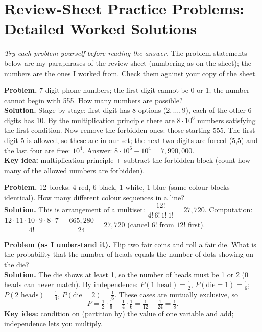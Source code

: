 \documentclass[11pt]{article}
\begin{document}
\section{Review-Sheet Practice Problems: Detailed Worked Solutions}\label{sec:practice}

\emph{Try each problem yourself before reading the answer.} The problem statements below are my paraphrases of the review sheet (numbering as on the sheet); the numbers are the ones I worked from. Check them against your copy of the sheet.

\begin{exbox}
\textbf{Problem.} 7-digit phone numbers; the first digit cannot be 0 or 1; the number cannot begin with 555. How many numbers are possible?\\
\textbf{Solution.} Stage by stage: first digit has 8 options ($2,\dots,9$), each of the other 6 digits has 10. By the multiplication principle there are $8\cdot10^6$ numbers satisfying the first condition. Now remove the forbidden ones: those starting 555. The first digit 5 is allowed, so these are in our set; the next two digits are forced (5,5) and the last four are free: $10^4$. Answer: $8\cdot10^6-10^4=\boxed{7{,}990{,}000}$.\\
\textbf{Key idea:} multiplication principle + subtract the forbidden block (count how many of the allowed numbers are forbidden).
\end{exbox}

\begin{exbox}
\textbf{Problem.} 12 blocks: 4 red, 6 black, 1 white, 1 blue (same-colour blocks identical). How many different colour sequences in a line?\\
\textbf{Solution.} This is arrangement of a multiset: $\dfrac{12!}{4!\,6!\,1!\,1!}=\boxed{27{,}720}$. Computation: $\dfrac{12\cdot11\cdot10\cdot9\cdot8\cdot7}{4!}=\dfrac{665{,}280}{24}=27{,}720$ (cancel $6!$ from $12!$ first).
\end{exbox}

\begin{exbox}[\#4 ``Heads = dots'']
\textbf{Problem (as I understand it).} Flip two fair coins and roll a fair die. What is the probability that the number of heads equals the number of dots showing on the die?\\
\textbf{Solution.} The die shows at least 1, so the number of heads must be 1 or 2 (0 heads can never match). By independence: $P(1\text{ head})=\tfrac12$, $P(\text{die}=1)=\tfrac16$; $P(2\text{ heads})=\tfrac14$, $P(\text{die}=2)=\tfrac16$. These cases are mutually exclusive, so
\[ P=\tfrac12\cdot\tfrac16+\tfrac14\cdot\tfrac16=\tfrac1{12}+\tfrac1{24}=\boxed{\tfrac18}. \]
\textbf{Key idea:} condition on (partition by) the value of one variable and add; independence lets you multiply.
\end{exbox}
\end{document}
